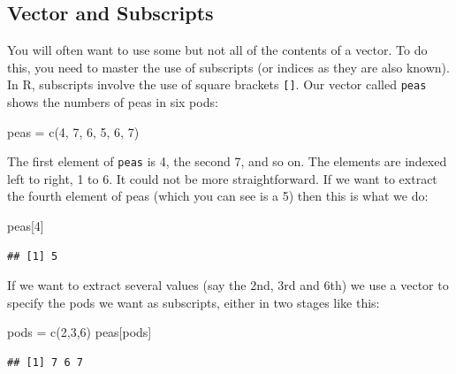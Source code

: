 \documentclass[
]{book}
\newenvironment{Shaded}{\begin{snugshade}}{\end{snugshade}}
\newcommand{\DecValTok}[1]{\textcolor[rgb]{0.00,0.00,0.81}{#1}}
\newcommand{\FunctionTok}[1]{\textcolor[rgb]{0.00,0.00,0.00}{#1}}
\newcommand{\NormalTok}[1]{#1}
\newcommand{\OtherTok}[1]{\textcolor[rgb]{0.56,0.35,0.01}{#1}}
\theoremstyle{definition}
\theoremstyle{definition}
\theoremstyle{definition}
\theoremstyle{definition}
\theoremstyle{remark}
\begin{document}
\hypertarget{vector-and-subscripts}{%
\subsection{Vector and Subscripts}\label{vector-and-subscripts}}

You will often want to use some but not all of the contents of a vector. To do this, you need to master the use of subscripts (or indices as they are also known). In R, subscripts involve the use of square brackets \texttt{{[}{]}}. Our vector called \texttt{peas} shows the numbers of peas in six pods:

\begin{Shaded}
\begin{Highlighting}[]
\NormalTok{peas }\OtherTok{=} \FunctionTok{c}\NormalTok{(}\DecValTok{4}\NormalTok{, }\DecValTok{7}\NormalTok{, }\DecValTok{6}\NormalTok{, }\DecValTok{5}\NormalTok{, }\DecValTok{6}\NormalTok{, }\DecValTok{7}\NormalTok{)}
\end{Highlighting}
\end{Shaded}

The first element of \texttt{peas} is 4, the second 7, and so on. The elements are indexed left to right, 1 to 6. It could not be more straightforward. If we want to extract the fourth element of peas (which you can see is a 5) then this is what we do:

\begin{Shaded}
\begin{Highlighting}[]
\NormalTok{peas[}\DecValTok{4}\NormalTok{]}
\end{Highlighting}
\end{Shaded}

\begin{verbatim}
## [1] 5
\end{verbatim}

If we want to extract several values (say the 2nd, 3rd and 6th) we use a vector to specify the pods we want as subscripts, either in two stages like this:

\begin{Shaded}
\begin{Highlighting}[]
\NormalTok{pods }\OtherTok{=} \FunctionTok{c}\NormalTok{(}\DecValTok{2}\NormalTok{,}\DecValTok{3}\NormalTok{,}\DecValTok{6}\NormalTok{)}
\NormalTok{peas[pods]}
\end{Highlighting}
\end{Shaded}

\begin{verbatim}
## [1] 7 6 7
\end{verbatim}
\end{document}
